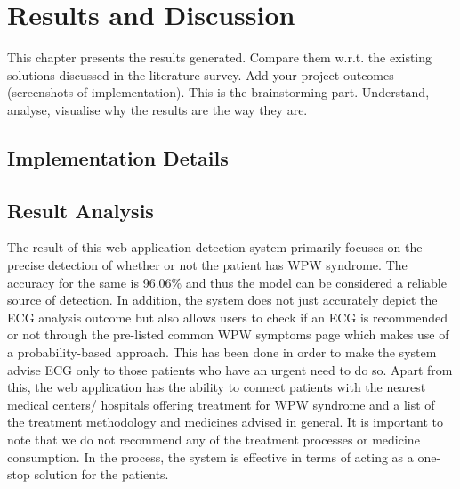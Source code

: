 \chapter{Results and Discussion}

This chapter presents the results generated. Compare them w.r.t. the existing solutions discussed in the literature survey. Add your project outcomes (screenshots of implementation). This is the brainstorming part. Understand, analyse, visualise why the results are the way they are. 

\section{Implementation Details}


\section{Result Analysis}
The result of this web application detection system primarily focuses on the precise detection of whether or not the patient has WPW syndrome. The accuracy for the same is 96.06\% and thus the model can be considered a reliable source of detection. In addition, the system does not just accurately depict the ECG analysis outcome but also allows users to check if an ECG is recommended or not through the pre-listed common WPW symptoms page which makes use of a probability-based approach. This has been done in order to make the system advise ECG only to those patients who have an urgent need to do so. Apart from this, the web application has the ability to connect patients with the nearest medical centers/ hospitals offering treatment for WPW syndrome and a list of the treatment methodology and medicines advised in general. It is important to note that we do not recommend any of the treatment processes or medicine consumption. In the process, the system is effective in terms of acting as a one-stop solution for the patients. 
